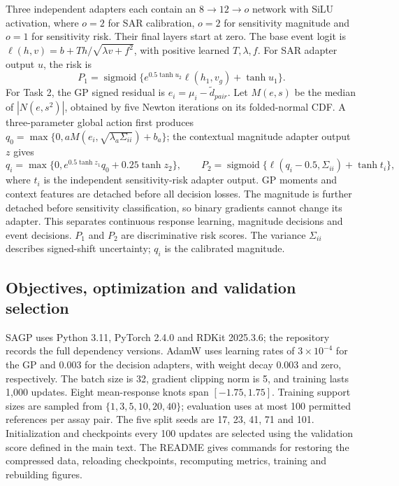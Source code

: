 \documentclass[letterpaper]{article}
\begin{document}
Three independent adapters each contain an $8\rightarrow12\rightarrow o$ network with SiLU activation, where $o=2$ for SAR calibration, $o=2$ for sensitivity magnitude and $o=1$ for sensitivity risk. Their final layers start at zero. The base event logit is $\ell(h,v)=b+Th/\sqrt{\lambda v+f^2}$, with positive learned $T,\lambda,f$. For SAR adapter output $u$, the risk is
\begin{equation}
 P_1=\operatorname{sigmoid}\{e^{0.5\tanh u_2}\ell(h_1,v_g)+\tanh u_1\}.
\end{equation}
For Task 2, the GP signed residual is $e_i=\mu_i-\widetilde d_{pair}$. Let $M(e,s)$ be the median of $|N(e,s^2)|$, obtained by five Newton iterations on its folded-normal CDF. A three-parameter global action first produces $q_0=\max\{0,aM(e_i,\sqrt{\lambda_a\Sigma_{ii}})+b_a\}$; the contextual magnitude adapter output $z$ gives
\begin{equation}
 q_i=\max\{0,e^{0.5\tanh z_1}q_0+0.25\tanh z_2\},\qquad
 P_2=\operatorname{sigmoid}\{\ell(q_i-0.5,\Sigma_{ii})+\tanh t_i\},
\end{equation}
where $t_i$ is the independent sensitivity-risk adapter output. GP moments and context features are detached before all decision losses. The magnitude is further detached before sensitivity classification, so binary gradients cannot change its adapter. This separates continuous response learning, magnitude decisions and event decisions. $P_1$ and $P_2$ are discriminative risk scores. The variance $\Sigma_{ii}$ describes signed-shift uncertainty; $q_i$ is the calibrated magnitude.

\subsection{Objectives, optimization and validation selection}

SAGP uses Python 3.11, PyTorch 2.4.0 and RDKit 2025.3.6; the repository records the full dependency versions. AdamW uses learning rates of $3\times10^{-4}$ for the GP and 0.003 for the decision adapters, with weight decay 0.003 and zero, respectively. The batch size is 32, gradient clipping norm is 5, and training lasts 1,000 updates. Eight mean-response knots span $[-1.75,1.75]$. Training support sizes are sampled from $\{1,3,5,10,20,40\}$; evaluation uses at most 100 permitted references per assay pair. The five split seeds are 17, 23, 41, 71 and 101. Initialization and checkpoints every 100 updates are selected using the validation score defined in the main text. The README gives commands for restoring the compressed data, reloading checkpoints, recomputing metrics, training and rebuilding figures.
\end{document}
